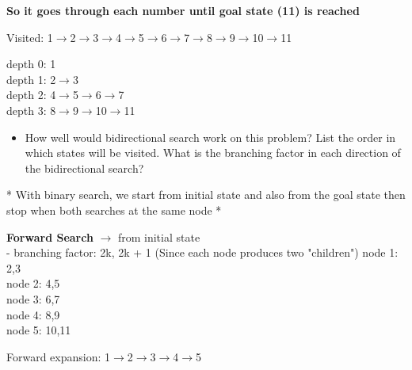 \documentclass{article}
\begin{document}
\begin{center}
   \textbf{So it goes through each number until goal state (11) is reached}
\end{center}
\begin{center}
   Visited: 1$\rightarrow$2$\rightarrow$3$\rightarrow$4$\rightarrow$5$\rightarrow$6$\rightarrow$7$\rightarrow$8$\rightarrow$9$\rightarrow$10$\rightarrow$11
\end{center}

depth 0: 1\\
depth 1: 2$\rightarrow$3\\
depth 2: 4$\rightarrow$5$\rightarrow$6$\rightarrow$7\\
depth 3: 8$\rightarrow$9$\rightarrow$10$\rightarrow$11

\begin{itemize}
   \item How well would bidirectional search work on this problem? List the order in which states will be visited. What is the branching factor in each direction of the bidirectional search?
\end{itemize}

\begin{center}
   * With binary search, we start from initial state and also from the goal state then stop when both searches at the same node *
\end{center}

\textbf{Forward Search} $\rightarrow$ from initial state\\
- branching factor: 2k, 2k + 1 (Since each node produces two "children")
node 1: 2,3\\
node 2: 4,5\\
node 3: 6,7\\
node 4: 8,9\\
node 5: 10,11\\
\begin{center}
   Forward expansion: 1$\rightarrow$2$\rightarrow$3$\rightarrow$4$\rightarrow$5
\end{center}
\end{document}
